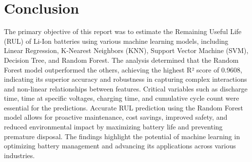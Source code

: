 \chapter{Conclusion}

The primary objective of this report was to estimate the Remaining Useful Life (RUL) of Li-Ion 
batteries using various machine learning models, including Linear Regression, K-Nearest 
Neighbors (KNN), Support Vector Machine (SVM), Decision Tree, and Random Forest. The 
analysis determined that the Random Forest model outperformed the others, achieving the 
highest R² score of 0.9608, indicating its superior accuracy and robustness in capturing 
complex interactions and non-linear relationships between features. Critical variables such as 
discharge time, time at specific voltages, charging time, and cumulative cycle count were 
essential for the predictions. Accurate RUL prediction using the Random Forest model allows 
for proactive maintenance, cost savings, improved safety, and reduced environmental impact 
by maximizing battery life and preventing premature disposal. The findings highlight the 
potential of machine learning in optimizing battery management and advancing its 
applications across various industries. 
